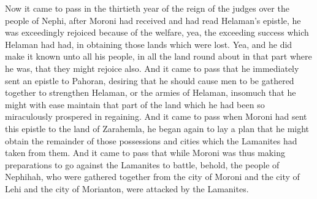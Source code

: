 \bchapter
\bverse \iffalse Now it came to pass in the thirtieth year of the reign of the judges over the people of Nephi, after Moroni had received and had read Helaman's epistle, he was exceedingly rejoiced because of the welfare, yea, the exceeding success which Helaman had had, in obtaining those lands which were lost. \fi
Now it came to pass in the thirtieth year of the reign of the judges over the people of Nephi, after Moroni had received and had read Helaman's epistle, he was exceedingly rejoiced because of the welfare, yea, the exceeding success which Helaman had had, in obtaining those lands which were lost.
\bverse \iffalse Yea, and he did make it known unto all his people, in all the land round about in that part where he was, that they might rejoice also. \fi
Yea, and he did make it known unto all his people, in all the land round about in that part where he was, that they might rejoice also.
\bverse \iffalse And it came to pass that he immediately sent an epistle to Pahoran, desiring that he should cause men to be gathered together to strengthen Helaman, or the armies of Helaman, insomuch that he might with ease maintain that part of the land which he had been so miraculously prospered in regaining. \fi
And it came to pass that he immediately sent an epistle to Pahoran, desiring that he should cause men to be gathered together to strengthen Helaman, or the armies of Helaman, insomuch that he might with ease maintain that part of the land which he had been so miraculously prospered in regaining.
\bverse \iffalse And it came to pass when Moroni had sent this epistle to the land of Zarahemla, he began again to lay a plan that he might obtain the remainder of those possessions and cities which the Lamanites had taken from them. \fi
And it came to pass when Moroni had sent this epistle to the land of Zarahemla, he began again to lay a plan that he might obtain the remainder of those possessions and cities which the Lamanites had taken from them.
\bverse \iffalse And it came to pass that while Moroni was thus making preparations to go against the Lamanites to battle, behold, the people of Nephihah, who were gathered together from the city of Moroni and the city of Lehi and the city of Morianton, were attacked by the Lamanites. \fi
And it came to pass that while Moroni was thus making preparations to go against the Lamanites to battle, behold, the people of Nephihah, who were gathered together from the city of Moroni and the city of Lehi and the city of Morianton, were attacked by the Lamanites.
